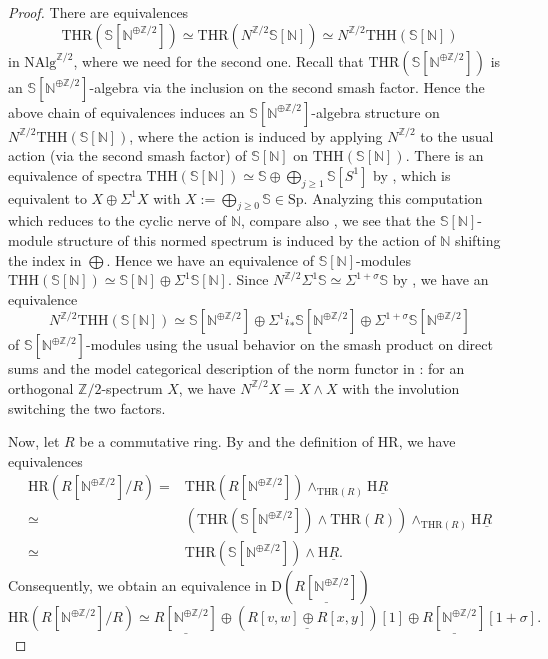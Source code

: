 \documentclass[10pt]{amsart}
\theoremstyle{definition}
\numberwithin{equation}{section}
\newcommand{\N}{\mathbb{N}}
\newcommand{\Sphere}{\mathbb{S}}
\newcommand{\Z}{\mathbb{Z}}
\newcommand{\rD}{\mathrm{D}}
\newcommand{\rH}{\mathrm{H}}
\newcommand{\ul}{\underline}
\newcommand{\NAlg}{\mathrm{NAlg}}
\newcommand{\Sp}{\mathrm{Sp}}
\newcommand{\HR}{\mathrm{HR}}
\newcommand{\THH}{\mathrm{THH}}
\newcommand{\THR}{\mathrm{THR}}
\begin{document}
\begin{proof}
There are equivalences
\[
\THR(\Sphere[\N^{\oplus \Z/2}])
\simeq 
\THR(N^{\Z/2}\Sphere[\N])
\simeq
N^{\Z/2}
\THH(\Sphere[\N])
\]
in $\NAlg^{\Z/2}$,
where we need \cite[Proposition 2.1.3]{HP23} for the second one.
Recall that $\THR(\Sphere[\N^{\oplus \Z/2}])$ is an $\Sphere[\N^{\oplus \Z/2}]$-algebra via the inclusion on the second smash factor. Hence the above chain of equivalences induces an $\Sphere[\N^{\oplus \Z/2}]$-algebra structure on $N^{\Z/2}
\THH(\Sphere[\N])$, where the action is induced by applying $N^{\Z/2}$ to the usual action (via the second smash factor) of $\Sphere[\N]$ on $\THH(\Sphere[\N])$.
There is an equivalence of spectra $\THH(\Sphere[\N])\simeq \Sphere\oplus \bigoplus_{j\geq 1}\Sphere[S^1]$ by \cite[Proposition 3.20]{Rog09},
which is equivalent to $X\oplus \Sigma^1 X$ with $X:=\bigoplus_{j\geq 0}\Sphere\in \Sp$.
Analyzing this computation which reduces to the cyclic nerve of $\N$, compare also \cite[Proposition 4.2.11]{HP23}, we see that the $\Sphere[\N]$-module structure of this normed spectrum is induced by the action of $\N$ shifting the index in $\bigoplus$.
Hence we have an equivalence of $\Sphere[\N]$-modules $\THH(\Sphere[\N])\simeq \Sphere[\N]\oplus \Sigma^1\Sphere[\N]$.
Since $N^{\Z/2}\Sigma^1 \Sphere
\simeq
\Sigma^{1+\sigma}\Sphere$ by \cite[Proposition A.59]{HHR},
we have an equivalence
\[
N^{\Z/2}\THH(\Sphere[\N])
\simeq
\Sphere[\N^{\oplus \Z/2}] \oplus \Sigma^1 i_*\Sphere[\N^{\oplus \Z/2}]
\oplus
\Sigma^{1+\sigma} \Sphere[\N^{\oplus \Z/2}]
\]
of $\Sphere[\N^{\oplus \Z/2}]$-modules
using the usual behavior on the smash product on direct sums and the model categorical description of the norm functor in \cite[section 2.2.3]{HHR}:
for an orthogonal $\Z/2$-spectrum $X$,
we have $N^{\Z/2} X = X\wedge X$ with the involution switching the two factors.

Now, let $R$ be a commutative ring.
By \cite[Proposition 4.2.15]{HP23} and the definition of $\HR$,
we have equivalences
\begin{align*}
\HR(R[\N^{\oplus \Z/2}]/R)
= &
\THR(R[\N^{\oplus \Z/2}])\wedge_{\THR(R)}\rH \ul{R}
\\
\simeq &
(\THR(\Sphere[\N^{\oplus \Z/2}])\wedge \THR(R))\wedge_{\THR(R)}\rH \ul{R}
\\
\simeq &
\THR(\Sphere[\N^{\oplus \Z/2}])\wedge \rH \ul{R}.
\end{align*}
Consequently, we obtain an equivalence in $\rD(\ul{R[\N^{\oplus \Z/2}]})$
\[
\HR(R[\N^{\oplus \Z/2}]/R)
\simeq  \ul{R[\N^{\oplus \Z/2}]} \oplus  (\ul{R[v,w] \oplus R[x,y]})[1] \oplus \ul{R[\N^{\oplus \Z/2}]}[1 + \sigma].
\]


\end{proof}
\end{document}
